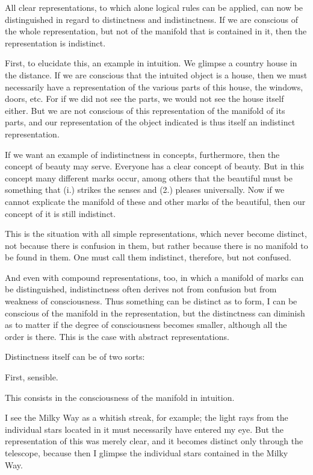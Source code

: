 All clear representations, to which alone logical rules can be applied,
can now be distinguished in regard to distinctness and indistinctness.
If we are conscious of the whole representation,
but not of the manifold that is contained in it,
then the representation is indistinct.

    First, to elucidate this, an example in intuition.
    We glimpse a country house in the distance.
    If we are conscious that the intuited object is a house,
    then we must necessarily have a representation of
    the various parts of this house, the windows, doors, etc.
    For if we did not see the parts, we would not see the house itself either.
    But we are not conscious of this representation of the manifold of its parts,
    and our representation of the object indicated is thus itself an indistinct representation.

    If we want an example of indistinctness in concepts, furthermore, then
    the concept of beauty may serve. Everyone has a clear concept of beauty.
    But in this concept many different marks occur, among others that the
    beautiful must be something that (i.) strikes the senses and (2.) pleases
    universally. Now if we cannot explicate the manifold of these and other
    marks of the beautiful, then our concept of it is still indistinct.

    This is the situation with all simple representations,
    which never become distinct,
    not because there is confusion in them,
    but rather because there is no manifold to be found in them.
    One must call them indistinct, therefore, but not confused.

    And even with compound representations, too, in which
    a manifold of marks can be distinguished,
    indistinctness often derives not from confusion
    but from weakness of consciousness.
    Thus something can be distinct as to form,
    I can be conscious of the manifold in the representation,
    but the distinctness can diminish as to matter if
    the degree of consciousness becomes smaller,
    although all the order is there.
    This is the case with abstract representations.

Distinctness itself can be of two sorts:

First, sensible.

This consists in the consciousness of the manifold in intuition.

    I see the Milky Way as a whitish streak, for example;
    the light rays from the individual stars located in it
    must necessarily have entered my eye.
    But the representation of this was merely clear,
    and it becomes distinct only through the telescope,
    because then I glimpse the individual stars contained in the Milky Way.

